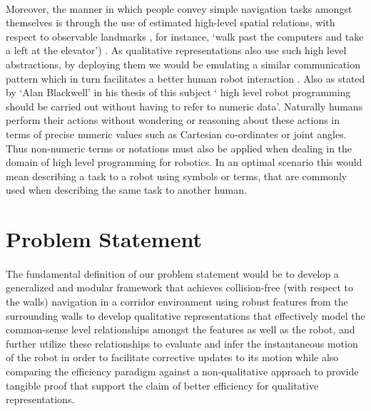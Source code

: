 \paragraph{} Moreover, the manner in which people convey simple navigation tasks amongst themselves is through the use of estimated high-level spatial relations, with respect to observable landmarks \cite{michon2001and} \cite{chen2015survey} , for instance, `walk past the computers and take a left at the elevator') \cite{shah2013qualitative}. As qualitative representations also use such high level abstractions, by deploying them we would be emulating a similar communication pattern which in turn facilitates a better human robot interaction \cite{dondrup2015computational}. Also as stated by `Alan Blackwell' in his thesis \cite{blackwell1988spatial} of this subject ` high level robot programming should be carried out without having to refer to numeric data'. Naturally humans perform their actions without wondering or reasoning about these actions in terms of precise numeric values such as Cartesian co-ordinates or joint angles. Thus non-numeric terms or notations must also be applied when dealing in the domain of high level programming for robotics. In an optimal scenario this would mean describing a task to a robot using symbols or terms, that are commonly used when describing the same task to another human.


\section{Problem Statement}
\paragraph{} The fundamental definition of our problem statement would be to develop a generalized and modular framework that  achieves collision-free (with respect to the walls) navigation in a corridor environment using robust features from the surrounding walls to develop qualitative representations that effectively model the common-sense level relationships amongst the features as well as the robot, and further utilize these relationships to evaluate and infer the instantaneous motion of the robot in order to facilitate corrective updates to its motion while also comparing the efficiency paradigm against a non-qualitative approach to provide tangible proof that support the claim of better efficiency for qualitative representations.


